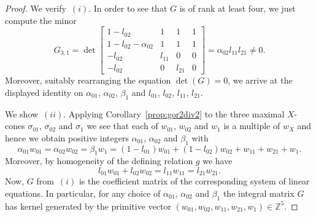 \documentclass[pdftex]{sigma}%
\theoremstyle{definition}
\def\ZZ{{\mathbb Z}}
\numberwithin{equation}{section}
\begin{document}
\begin{proof}
We verify~$(i)$. In order to see that $G$ is of rank at least
four, we just compute the minor
\[
G_{3,1} =\det
\begin{bmatrix}
1-l_{02} & 1 & 1 & 1
\\
1-l_{02}-\alpha_{02} & 1 & 1 & 1
\\
-l_{02} & l_{11} & 0 & 0
\\
-l_{02} & 0 & l_{21} & 0
\end{bmatrix}
 =\alpha_{02} l_{11}l_{21} \ne 0.
\]
Moreover, suitably rearranging the equation
$\det(G) = 0$, we arrive at the displayed identity on
$\alpha_{01}$, $\alpha_{02}$, $\beta_1$ and
$l_{01}$, $l_{02}$, $l_{11}$, $l_{21}$.

We show~$(ii)$.
Applying Corollary~\ref{prop:gor2div2} to the
three maximal $X$-cones $\sigma_{01}$, $\sigma_{02}$
and $\sigma_1$ we see that each of $w_{01}$, $w_{02}$ and $w_1$
is a multiple of $w_X$ and hence we obtain
positive integers $\alpha_{01}$, $\alpha_{02}$ and $\beta_1$
with
\begin{equation*}
\alpha_{01} w_{01}
 =
\alpha_{02} w_{02}
 =
\beta_1 w_1
 =
(1-l_{01}) w_{01} + (1-l_{02}) w_{02} + w_{11} + w_{21} + w_1.
\end{equation*}
Moreover, by homogeneity of the defining relation
$g$ we have
\begin{equation*}
l_{01} w_{01} + l_{02}w_{02} =l_{11} w_{11} =l_{21} w_{21}.
\end{equation*}
Now, $G$ from~$(i)$ is the coefficient matrix of
the corresponding system of linear equations.
In particular, for any choice of
$\alpha_{01}$, $\alpha_{02}$ and $\beta_1$
the integral matrix $G$ has kernel generated by
the primitive vector
$(w_{01},w_{02},w_{11},w_{21},w_1) \in \ZZ^5$.


\end{proof}
\end{document}

